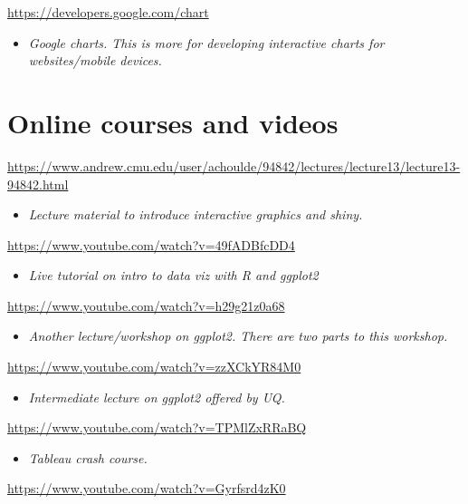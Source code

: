 \documentclass[
]{book}
\providecommand{\tightlist}{%
  \setlength{\itemsep}{0pt}\setlength{\parskip}{0pt}}
\begin{document}
\url{https://developers.google.com/chart}

\begin{itemize}
\tightlist
\item
  \emph{Google charts. This is more for developing interactive charts for websites/mobile devices.}
\end{itemize}

\hypertarget{online-courses-and-videos}{%
\section{Online courses and videos}\label{online-courses-and-videos}}

\url{https://www.andrew.cmu.edu/user/achoulde/94842/lectures/lecture13/lecture13-94842.html}

\begin{itemize}
\tightlist
\item
  \emph{Lecture material to introduce interactive graphics and shiny.}
\end{itemize}

\url{https://www.youtube.com/watch?v=49fADBfcDD4}

\begin{itemize}
\tightlist
\item
  \emph{Live tutorial on intro to data viz with R and ggplot2}
\end{itemize}

\url{https://www.youtube.com/watch?v=h29g21z0a68}

\begin{itemize}
\tightlist
\item
  \emph{Another lecture/workshop on ggplot2. There are two parts to this workshop.}
\end{itemize}

\url{https://www.youtube.com/watch?v=zzXCkYR84M0}

\begin{itemize}
\tightlist
\item
  \emph{Intermediate lecture on ggplot2 offered by UQ.}
\end{itemize}

\url{https://www.youtube.com/watch?v=TPMlZxRRaBQ}

\begin{itemize}
\tightlist
\item
  \emph{Tableau crash course.}
\end{itemize}

\url{https://www.youtube.com/watch?v=Gyrfsrd4zK0}
\end{document}
